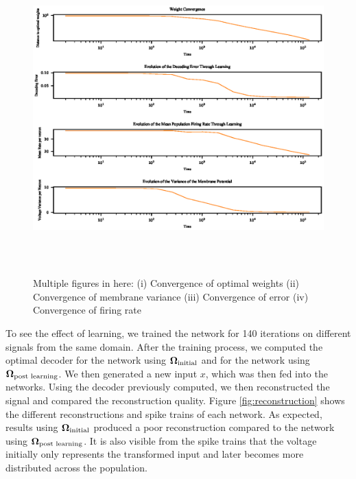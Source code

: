 \documentclass[twoside,11pt]{article}
\begin{document}
\begin{figure}[!htb]
  \includegraphics[width = \columnwidth, height=12cm]{figures/convergence.eps}
  \caption{Multiple figures in here: (i) Convergence of optimal weights
  (ii) Convergence of membrane variance (iii) Convergence of error (iv) Convergence
  of firing rate}
  \label{fig:convergence}
\end{figure}
\newpage

To see the effect of learning, we trained the network for 140
iterations on different signals from the same domain. After the training process, we
computed the optimal decoder for the network using $\mathbf{\Omega}_{\textnormal{initial}}$ and
for the network using $\mathbf{\Omega}_{\textnormal{post learning}}$. We then generated a
new input $x$, which was then fed into the networks.
Using the decoder previously computed, we then reconstructed the signal and
compared the reconstruction quality. Figure \ref{fig:reconstruction} shows the different
reconstructions and spike trains of each network. As expected, results using
$\mathbf{\Omega}_{\textnormal{initial}}$ produced a poor reconstruction
compared to the network using $\mathbf{\Omega}_{\textnormal{post learning}}$.
It is also visible from the spike trains that the voltage initially
only represents the transformed input and later becomes more distributed across
the population.
\end{document}
